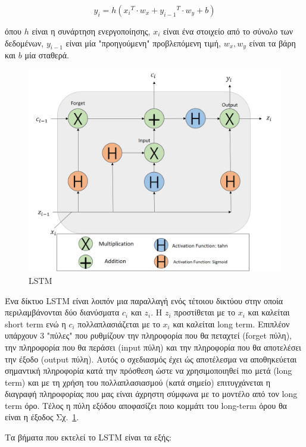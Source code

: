 \documentclass[a4paper,12pt]{report}
\theoremstyle{definitionNODot}
\begin{document}
\begin{itemize}
		$$ y_i = h({x_i}^T \cdot {w_x} + {y_{i-1}}^T\cdot {w_y} + b)$$
		
		όπου $h$ είναι η συνάρτηση ενεργοποίησης, $x_i$ είναι ένα στοιχείο από το σύνολο των δεδομένων, $y_{i-1}$ είναι μία "προηγούμενη" προβλεπόμενη τιμή, $w_x, w_y$ είναι τα βάρη και $b$ μία σταθερά.
		
		\begin{figure}[h]
			\centering
			\includegraphics[width=\textwidth]{lstmarchitecture2.png}
			\caption{LSTM}
			\label{fig:lstmarchitecture}
		\end{figure}
		
		Ένα δίκτυο LSTM είναι λοιπόν μια παραλλαγή ενός τέτοιου δικτύου \cite{LSTM1997HochreiterSchmidhuber} στην οποία περιλαμβάνονται δύο διανύσματα $c_i$ και $z_i$. Η $z_i$ προστίθεται με το $x_i$ και καλείται short term ενώ η $c_i$ πολλαπλασιάζεται με το $x_i$ και καλείται long term. Επιπλέον υπάρχουν 3 "πύλες" που ρυθμίζουν την πληροφορία που θα πεταχτεί (forget πύλη), την πληροφορία που θα περάσει (input πύλη) και την πληροφορία που θα αποτελέσει την έξοδο (output πύλη). Αυτός ο σχεδιασμός έχει ώς αποτέλεσμα να αποθηκεύεται σημαντική πληροφορία κατά την πρόσθεση ώστε να χρησιμοποιηθεί πιο μετά (long term) και με τη χρήση του πολλαπλασιασμού (κατά σημείο) επιτυγχάνεται η διαγραφή πληροφορίας που μας είναι άχρηστη σύμφωνα με το μοντέλο από τον long term όρο. Τέλος η πύλη εξόδου αποφασίζει ποιο κομμάτι του long-term όρου θα είναι η έξοδος Σχ.~\ref{fig:lstmarchitecture}.
		
		Τα βήματα που εκτελεί το LSTM είναι τα εξής:
		

\end{itemize}
\end{document}
